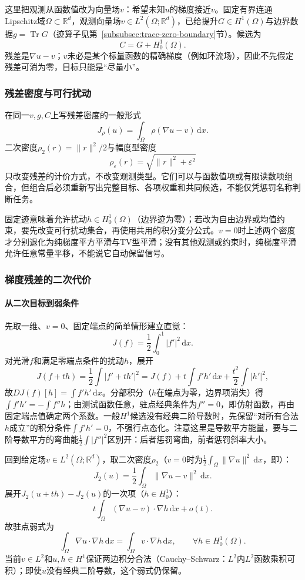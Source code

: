 这里把观测从函数值改为向量场$v$：希望未知$u$的梯度接近$v$。固定有界连通Lipschitz域$\Omega\subset\mathbb R^d$，观测向量场$v\in L^2(\Omega;\mathbb R^d)$，已给提升$G\in H^1(\Omega)$与边界数据$g=\operatorname{Tr}G$（迹算子见第~\ref{subsubsec:trace-zero-boundary}节）。候选为
\[
  C=G+H_0^1(\Omega).
\]
残差是$\nabla u-v$；$v$未必是某个标量函数的精确梯度（例如环流场），因此不先假定残差可消为零，目标只能是“尽量小”。

\subsubsection{残差密度与可行扰动}
\label{subsubsec:residual-density-feasible}

在同一$v,g,C$上写残差密度的一般形式
\[
  J_\rho(u)=\int_\Omega\rho(\nabla u-v)\,\mathrm dx.
\]
二次密度$\rho_2(r)=\|r\|^2/2$与幅度型密度
\[
  \rho_\varepsilon(r)=\sqrt{\|r\|^2+\varepsilon^2}
\]
只改变残差的计价方式，不改变观测类型。它们可以与函数值项或有限读数项组合，但组合后必须重新写出完整目标、各项权重和共同候选，不能仅凭惩罚名称判断任务。

固定迹意味着允许扰动$h\in H_0^1(\Omega)$（边界迹为零）；若改为自由边界或均值约束，要先改变可行扰动集合，再使用共用的积分变分公式。$v=0$时上述两个密度才分别退化为纯梯度平方平滑与TV型平滑；没有其他观测或约束时，纯梯度平滑允许任意常量平移，不能说它自动保留信号。

\subsubsection{梯度残差的二次代价}
\label{subsubsec:quadratic-gradient-cost}

\paragraph{从二次目标到弱条件}

先取一维、$v=0$、固定端点的简单情形建立直觉：
\[
  J(f)=\frac12\int_0^1|f'|^2\,\mathrm dx.
\]
对光滑$f$和满足零端点条件的扰动$h$，展开
\[
  J(f+th)=\frac12\int|f'+th'|^2
  =J(f)+t\int f'h'\,\mathrm dx+\frac{t^2}{2}\int|h'|^2,
\]
故$DJ(f)[h]=\int f'h'\,\mathrm dx$。分部积分（$h$在端点为零，边界项消失）得$\int f'h'=-\int f''h$；由测试函数任意，驻点经典条件为$f''=0$，即仿射函数，再由固定端点值确定两个系数。一般$H^1$候选没有经典二阶导数时，先保留“对所有合法$h$成立”的积分条件$\int f'h'=0$，不强行点态化。注意这里是导数平方能量，要与二阶导数平方的弯曲能$\frac12\int|f''|^2$区别开：后者惩罚弯曲，前者惩罚斜率大小。

回到给定场$v\in L^2(\Omega;\mathbb R^d)$，取二次密度$\rho_2$（$v=0$时为$\frac12\int_\Omega\|\nabla u\|^2\,\mathrm dx$，即）：
\[
  J_2(u)=\frac12\int_\Omega\|\nabla u-v\|^2\,\mathrm dx.
\]
展开$J_2(u+th)-J_2(u)$的一次项（$h\in H_0^1$）：
\[
  t\int_\Omega(\nabla u-v)\cdot\nabla h\,\mathrm dx+o(t).
\]
故驻点弱式为
\begin{equation}
  \int_\Omega\nabla u\cdot\nabla h\,\mathrm dx
  =\int_\Omega v\cdot\nabla h\,\mathrm dx,
  \qquad\forall h\in H_0^1(\Omega).
  \label{eq:functional-guided-poisson-weak}
\end{equation}
当前$v\in L^2$和$u,h\in H^1$保证两边积分合法（Cauchy--Schwarz：$L^2$内$L^2$函数乘积可积）；即使$u$没有经典二阶导数，这个弱式仍保留。

